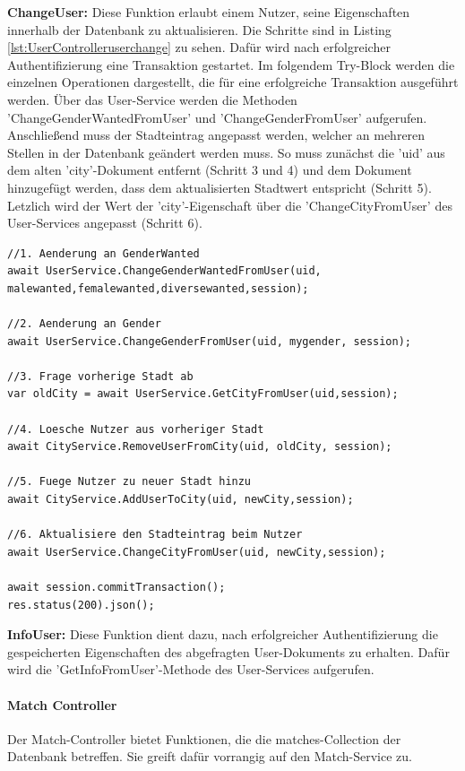 \noindent
\textbf{ChangeUser:}
Diese Funktion erlaubt einem Nutzer, seine Eigenschaften innerhalb der Datenbank zu aktualisieren. Die Schritte sind in Listing \ref{lst:UserControlleruserchange} zu sehen. Dafür wird nach erfolgreicher Authentifizierung eine Transaktion gestartet. Im folgendem Try-Block werden die einzelnen Operationen dargestellt, die für eine erfolgreiche Transaktion ausgeführt werden. Über das User-Service werden die Methoden 'ChangeGenderWantedFromUser' und 'ChangeGenderFromUser' aufgerufen. Anschließend muss der Stadteintrag angepasst werden, welcher an  mehreren Stellen in der Datenbank geändert werden muss. 
So muss zunächst die 'uid' aus dem alten 'city'-Dokument entfernt (Schritt 3 und 4) und dem  Dokument hinzugefügt werden, dass dem aktualisierten Stadtwert entspricht (Schritt 5). Letzlich wird der Wert der 'city'-Eigenschaft über die 'ChangeCityFromUser' des User-Services angepasst (Schritt 6).\\

\begin{lstlisting}[caption=UserController - Change User, label=lst:UserControlleruserchange]
//1. Aenderung an GenderWanted
await UserService.ChangeGenderWantedFromUser(uid, malewanted,femalewanted,diversewanted,session);

//2. Aenderung an Gender
await UserService.ChangeGenderFromUser(uid, mygender, session);

//3. Frage vorherige Stadt ab
var oldCity = await UserService.GetCityFromUser(uid,session);

//4. Loesche Nutzer aus vorheriger Stadt
await CityService.RemoveUserFromCity(uid, oldCity, session);

//5. Fuege Nutzer zu neuer Stadt hinzu
await CityService.AddUserToCity(uid, newCity,session);

//6. Aktualisiere den Stadteintrag beim Nutzer
await UserService.ChangeCityFromUser(uid, newCity,session);

await session.commitTransaction();
res.status(200).json();
\end{lstlisting}
  
\noindent
\textbf{InfoUser:}     
Diese Funktion dient dazu, nach erfolgreicher Authentifizierung die gespeicherten Eigenschaften des abgefragten User-Dokuments zu erhalten. Dafür wird die 'GetInfoFromUser'-Methode des User-Services aufgerufen.
        

%
%


\paragraph{Match Controller}
Der Match-Controller bietet Funktionen, die die matches-Collection der Datenbank betreffen. Sie greift dafür vorrangig auf den Match-Service zu.\\

